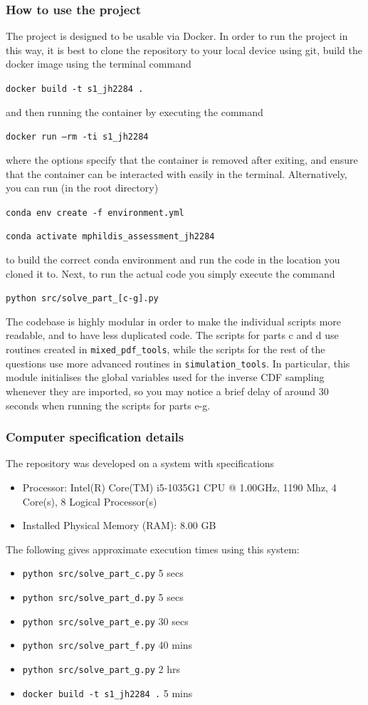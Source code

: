 \documentclass[12pt]{article}
\begin{document}
\subsubsection*{How to use the project}
The project is designed to be usable via Docker. In order to run the project in this way, it is best to clone the repository to your local device using git, build the docker
image using the terminal command

\texttt{docker build -t s1\_jh2284 .}

and then running the container by executing the command

\texttt{docker run --rm -ti s1\_jh2284}

where the options specify that the container is removed after exiting, and ensure that the container can be interacted with easily in the terminal.
Alternatively, you can run (in the root directory)

\texttt{conda env create -f environment.yml}

\texttt{conda activate mphildis\_assessment\_jh2284}

to build the correct conda environment and run the code in the location you cloned it to.
Next, to run the actual code you simply execute the command

\texttt{python src/solve\_part\_[c-g].py}

The codebase is highly modular in order to make the individual scripts more readable, and to have less duplicated code.
The scripts for parts c and d use routines created in \texttt{mixed\_pdf\_tools}, while the scripts for the rest of the questions use more advanced routines in \texttt{simulation\_tools}.
In particular, this module initialises the global variables used for the inverse CDF sampling whenever they are imported, so you may notice a brief delay of around 30 seconds when running the scripts for parts e-g.

\subsubsection*{Computer specification details}

The repository was developed on a system with specifications
\begin{itemize}
  \item Processor: Intel(R) Core(TM) i5-1035G1 CPU @ 1.00GHz, 1190 Mhz, 4 Core(s), 8 Logical Processor(s)
  \item Installed Physical Memory (RAM): 8.00 GB
\end{itemize}

The following gives approximate execution times using this system:
\begin{itemize}
  \item \texttt{python src/solve\_part\_c.py} 5 secs
  \item \texttt{python src/solve\_part\_d.py} 5 secs
  \item \texttt{python src/solve\_part\_e.py} 30 secs
  \item \texttt{python src/solve\_part\_f.py} 40 mins
  \item \texttt{python src/solve\_part\_g.py} 2 hrs
  \item \texttt{docker build -t s1\_jh2284 .} 5 mins
\end{itemize}
\end{document}
